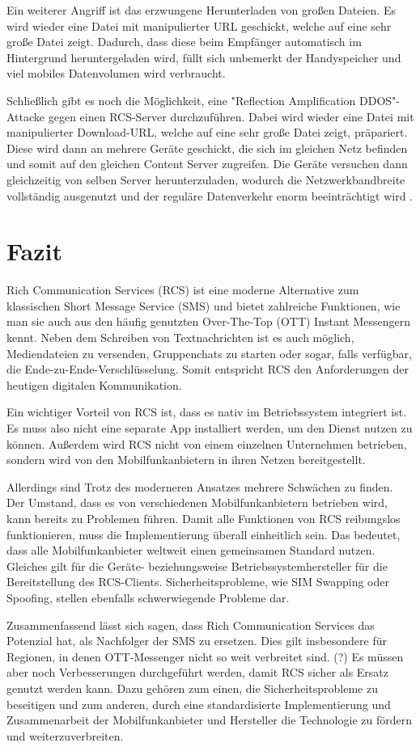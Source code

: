 \documentclass[conference]{IEEEtran}
\begin{document}
Ein weiterer Angriff ist das erzwungene Herunterladen von großen Dateien.
Es wird wieder eine Datei mit manipulierter URL geschickt, welche auf eine sehr große Datei zeigt.
Dadurch, dass diese beim Empfänger automatisch im Hintergrund heruntergeladen wird, füllt sich unbemerkt der Handyspeicher und viel mobiles Datenvolumen wird verbraucht.

Schließlich gibt es noch die Möglichkeit, eine "Reflection Amplification DDOS"-Attacke gegen einen RCS-Server durchzuführen.
Dabei wird wieder eine Datei mit manipulierter Download-URL, welche auf eine sehr große Datei zeigt, präpariert.
Diese wird dann an mehrere Geräte geschickt, die sich im gleichen Netz befinden und somit auf den gleichen Content Server zugreifen.
Die Geräte versuchen dann gleichzeitig von selben Server herunterzuladen, wodurch die Netzwerkbandbreite vollständig ausgenutzt und der reguläre Datenverkehr enorm beeinträchtigt wird \cite{uncoversec}.


\section{Fazit}

Rich Communication Services (RCS) ist eine moderne Alternative zum klassischen Short Message Service (SMS) und bietet zahlreiche Funktionen, wie man sie auch aus den häufig genutzten Over-The-Top (OTT) Instant Messengern kennt.
Neben dem Schreiben von Textnachrichten ist es auch möglich, Mediendateien zu versenden, Gruppenchats zu starten oder sogar, falls verfügbar, die Ende-zu-Ende-Verschlüsselung.
Somit entspricht RCS den Anforderungen der heutigen digitalen Kommunikation.

Ein wichtiger Vorteil von RCS ist, dass es nativ im Betriebssystem integriert ist.
Es muss also nicht eine separate App installiert werden, um den Dienst nutzen zu können.
Außerdem wird RCS nicht von einem einzelnen Unternehmen betrieben, sondern wird von den Mobilfunkanbietern in ihren Netzen bereitgestellt.

Allerdings sind Trotz des moderneren Ansatzes mehrere Schwächen zu finden.
Der Umstand, dass es von verschiedenen Mobilfunkanbietern betrieben wird, kann bereits zu Problemen führen.
Damit alle Funktionen von RCS reibungslos funktionieren, muss die Implementierung überall einheitlich sein.
Das bedeutet, dass alle Mobilfunkanbieter weltweit einen gemeinsamen Standard nutzen.
Gleiches gilt für die Geräte- beziehungsweise Betriebssystemhersteller für die Bereitstellung des RCS-Clients.
Sicherheitsprobleme, wie SIM Swapping oder Spoofing, stellen ebenfalls schwerwiegende Probleme dar.

Zusammenfassend lässt sich sagen, dass Rich Communication Services das Potenzial hat, als Nachfolger der SMS zu ersetzen.
Dies gilt insbesondere für Regionen, in denen OTT-Messenger nicht so weit verbreitet sind. (?)
Es müssen aber noch Verbesserungen durchgeführt werden, damit RCS sicher als Ersatz genutzt werden kann.
Dazu gehören zum einen, die Sicherheitsprobleme zu beseitigen und zum anderen, durch eine standardisierte Implementierung und Zusammenarbeit der Mobilfunkanbieter und Hersteller die Technologie zu fördern und weiterzuverbreiten.



\end{document}
